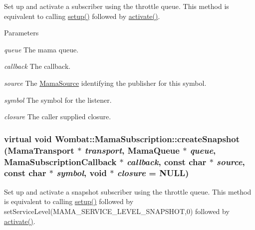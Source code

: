 Set up and activate a subscriber using the throttle queue. This method is equivalent to calling \hyperlink{classWombat_1_1MamaSubscription_a856510d1c73d4850c0f069a834cd839d}{setup()} followed by \hyperlink{classWombat_1_1MamaSubscription_abe7de53adbc4d0173692bae6073d985d}{activate()}.


\begin{DoxyParams}{Parameters}
\item[{\em queue}]The mama queue. \item[{\em callback}]The callback. \item[{\em source}]The \hyperlink{classWombat_1_1MamaSource}{MamaSource} identifying the publisher for this symbol. \item[{\em symbol}]The symbol for the listener. \item[{\em closure}]The caller supplied closure. \end{DoxyParams}
\hypertarget{classWombat_1_1MamaSubscription_a8a4dc0cdd12bbf92dfc12a6a13d2fa86}{
\subsubsection[{createSnapshot}]{\setlength{\rightskip}{0pt plus 5cm}virtual void Wombat::MamaSubscription::createSnapshot ({\bf MamaTransport} $\ast$ {\em transport}, \/  {\bf MamaQueue} $\ast$ {\em queue}, \/  {\bf MamaSubscriptionCallback} $\ast$ {\em callback}, \/  const char $\ast$ {\em source}, \/  const char $\ast$ {\em symbol}, \/  void $\ast$ {\em closure} = {\ttfamily NULL})}}
\label{classWombat_1_1MamaSubscription_a8a4dc0cdd12bbf92dfc12a6a13d2fa86}


Set up and activate a snapshot subscriber using the throttle queue. This method is equivalent to calling \hyperlink{classWombat_1_1MamaSubscription_a856510d1c73d4850c0f069a834cd839d}{setup()} followed by setServiceLevel(MAMA\_\-SERVICE\_\-LEVEL\_\-SNAPSHOT,0) followed by \hyperlink{classWombat_1_1MamaSubscription_abe7de53adbc4d0173692bae6073d985d}{activate()}.


